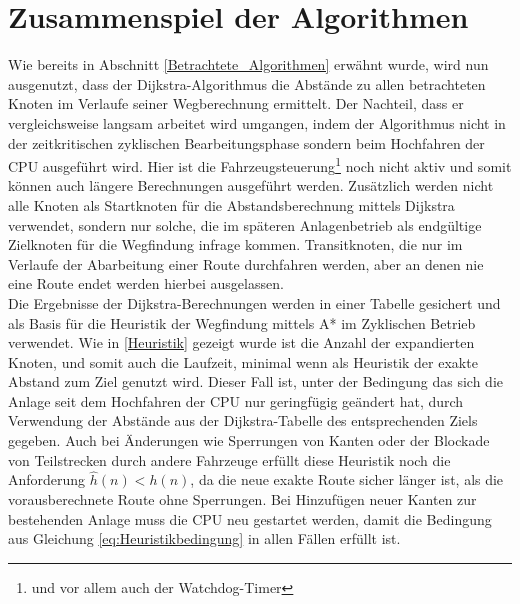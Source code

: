 	\section{Zusammenspiel der Algorithmen}
		Wie bereits in Abschnitt \ref{Betrachtete_Algorithmen} erwähnt wurde, wird nun ausgenutzt, dass der Dijkstra-Algorithmus die Abstände zu allen betrachteten Knoten im Verlaufe seiner Wegberechnung ermittelt.  Der Nachteil, dass er vergleichsweise langsam arbeitet wird umgangen, indem der Algorithmus nicht in der zeitkritischen zyklischen Bearbeitungsphase sondern beim Hochfahren der CPU ausgeführt wird. Hier ist die Fahrzeugsteuerung\footnote{und vor allem auch der Watchdog-Timer} noch nicht aktiv und somit können auch längere Berechnungen ausgeführt werden. Zusätzlich werden nicht alle Knoten als Startknoten für die Abstandsberechnung mittels Dijkstra verwendet, sondern nur solche, die im späteren Anlagenbetrieb als endgültige Zielknoten für die Wegfindung infrage kommen. Transitknoten, die nur im Verlaufe der Abarbeitung einer Route durchfahren werden, aber an denen nie eine Route endet werden hierbei ausgelassen.\\
		Die Ergebnisse der Dijkstra-Berechnungen werden in einer Tabelle gesichert und als Basis für die Heuristik der Wegfindung mittels A* im Zyklischen Betrieb verwendet. Wie in \ref{Heuristik} gezeigt wurde ist die Anzahl der expandierten Knoten, und somit auch die Laufzeit, minimal wenn als Heuristik der exakte  Abstand zum Ziel genutzt wird. Dieser Fall ist, unter der Bedingung das sich die Anlage seit dem Hochfahren der CPU nur geringfügig geändert hat, durch Verwendung der Abstände aus der Dijkstra-Tabelle des entsprechenden Ziels gegeben. Auch bei Änderungen wie Sperrungen von Kanten oder der Blockade von Teilstrecken durch andere Fahrzeuge erfüllt diese Heuristik noch die Anforderung $\hat{h}(n)<h(n)$, da die neue exakte Route sicher länger ist, als die vorausberechnete Route ohne Sperrungen. Bei Hinzufügen neuer Kanten zur bestehenden Anlage muss die CPU neu gestartet werden, damit die Bedingung aus Gleichung \ref{eq:Heuristikbedingung} in allen Fällen erfüllt ist.
		
		
				





